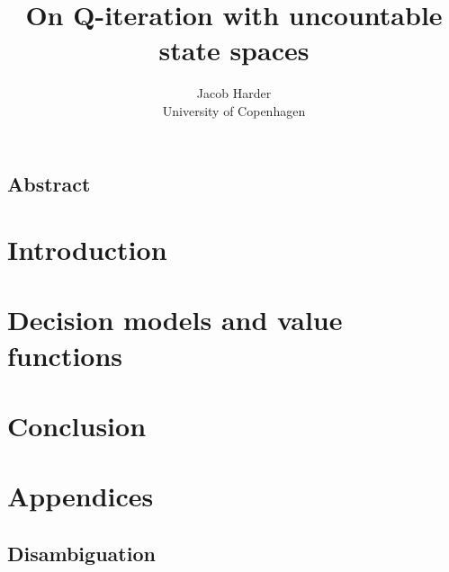 \documentclass{article}
\title{On Q-iteration with uncountable state spaces}
\author{Jacob Harder \\ University of Copenhagen}
\begin{document}
{\let\newpage\relax\maketitle}
\subsection*{Abstract}


\setcounter{tocdepth}{1}
\tableofcontents
\newpage

\section{Introduction}


\section{Decision models and value functions}


\section{Conclusion}

\setcounter{section}{0}%
\renewcommand{\thesection}{\Alph{section}}%
\newpage
\section{Appendices}

\subsection{Disambiguation}

\newpage
{}
\end{document}
